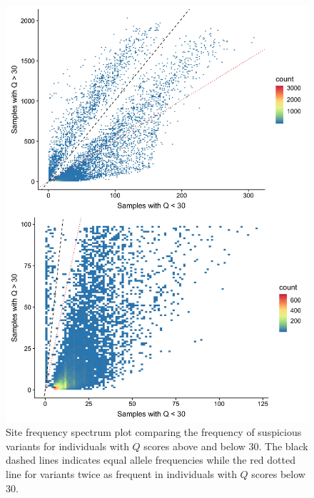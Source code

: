 \documentclass[custompaper]{MBE}%
\begin{document}
\begin{figure}[h]
\centering
\includegraphics[width=15cm,keepaspectratio]{./Figures/OverUnder30.jpg}
\caption{Site frequency spectrum plot comparing the frequency of suspicious variants for individuals with $Q$ scores above and below 30. The black dashed lines indicates equal allele frequencies while the red dotted line for variants twice as frequent in individuals with $Q$ scores below 30.}  
\label{90HanSFS_full}
\end{figure}
\end{document}
